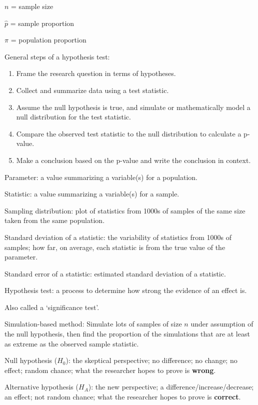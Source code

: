 \documentclass[
]{report}
\newcommand{\rgi}{\hspace{24pt}}  %
\begin{document}
\(n\) = sample size

\(\hat{p}\) = sample proportion

\(\pi\) = population proportion

General steps of a hypothesis test:

\begin{enumerate}
\def\labelenumi{\arabic{enumi}.}
\item
  Frame the research question in terms of hypotheses.
\item
  Collect and summarize data using a test statistic.
\item
  Assume the null hypothesis is true, and simulate or mathematically model a null distribution for the test statistic.
\item
  Compare the observed test statistic to the null distribution to calculate a p-value.
\item
  Make a conclusion based on the p-value and write the conclusion in context.
\end{enumerate}

Parameter: a value summarizing a variable(s) for a population.

Statistic: a value summarizing a variable(s) for a sample.

Sampling distribution: plot of statistics from 1000s of samples of the same size taken from the same population.

Standard deviation of a statistic: the variability of statistics from 1000s of samples; how far, on average, each statistic is from the true value of the parameter.

Standard error of a statistic: estimated standard deviation of a statistic.

Hypothesis test: a process to determine how strong the evidence of an effect is.

\rgi Also called a `significance test'.

Simulation-based method: Simulate lots of samples of size \(n\) under assumption of the null hypothesis, then find the proportion of the simulations that are at least as extreme as the observed sample statistic.

Null hypothesis (\(H_0\)): the skeptical perspective; no difference; no change; no effect; random chance; what the researcher hopes to prove is \textbf{wrong}.

Alternative hypothesis (\(H_A\)): the new perspective; a difference/increase/decrease; an effect; not random chance; what the researcher hopes to prove is \textbf{correct}.
\end{document}

